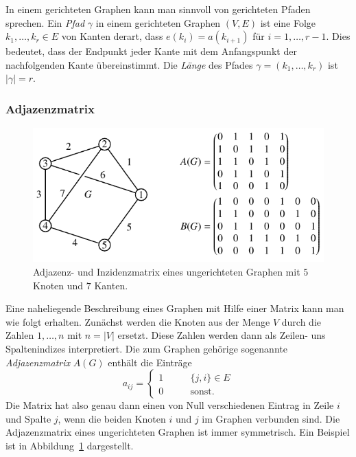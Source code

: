 In einem gerichteten Graphen kann man sinnvoll von gerichteten Pfaden
sprechen.
%
Ein {\em Pfad} $\gamma$ in einem gerichteten Graphen $(V,E)$ ist eine Folge
$k_1,\dots,k_r\in E$ von Kanten derart, dass $e(k_i) = a(k_{i+1})$
für $i=1,\dots,r-1$.
Dies bedeutet, dass der Endpunkt jeder Kante mit dem Anfangspunkt der
nachfolgenden Kante übereinstimmt.
Die {\em Länge} des Pfades $\gamma=(k_1,\dots,k_r)$ ist $|\gamma|=r$.

\subsubsection{Adjazenzmatrix}
\begin{figure}
\centering
\includegraphics{chapters/70-graphen/images/adjazenzu.pdf}
\caption{Adjazenz- und Inzidenzmatrix eines ungerichteten
Graphen mit $5$ Knoten und $7$ Kanten.
\label{buch:graphen:fig:adjazenzu}}
\end{figure}
Eine naheliegende Beschreibung eines Graphen mit Hilfe einer
Matrix kann man wie folgt erhalten.
Zunächst werden die Knoten aus der Menge $V$ durch die Zahlen
$1,\dots,n$ mit $n=|V|$ ersetzt.
Diese Zahlen werden dann als Zeilen- uns Spaltenindizes interpretiert.
Die zum Graphen gehörige sogenannte {\em Adjazenzmatrix} $A(G)$
enthält die Einträge
\begin{equation}
a_{ij}
=
\begin{cases}
1&\qquad  \{j,i\} \in E\\
0&\qquad  \text{sonst.}
\end{cases}
\label{buch:graphen:eqn:linkmatrix}
\end{equation}
Die Matrix hat also genau dann einen von Null verschiedenen Eintrag
in Zeile $i$ und Spalte $j$, wenn die beiden Knoten $i$ und $j$
im Graphen verbunden sind.
Die Adjazenzmatrix eines ungerichteten Graphen ist immer symmetrisch.
Ein Beispiel ist in Abbildung~\ref{buch:graphen:fig:adjazenzu}
dargestellt.

